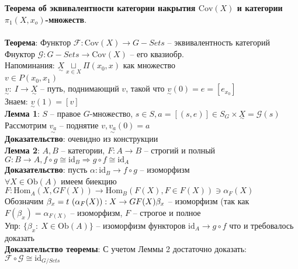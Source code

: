 \section{}
	\textbf{Теорема об эквивалентности категории накрытия $\text{Cov}(X)$ и категории ${\pi}_1 (X,x_o)$-множеств}.\\
	\\
	\textbf{Теорема}: Функтор $\mathcal{F}: \text{Cov}(X) \rightarrow G-Sets$ -- эквивалентность категорий\\
	Фнуктор $\mathscr{G}: G-Sets \rightarrow \text{Cov}(X)$ -- его квазиобр.\\
	Напоминания: $\underset{\sim}{X} \underset{x\in X}{\sqcup} \Pi (x_0,x)$ как множество\\
	$v\in P(x_0,x_1)$\\
	$\underset{\sim}{v}:\ I \rightarrow \underset{\sim}{X}$ -- путь, поднимающий $v$, такой что $\underset{\sim}{v} (0) = e = [e_{x_0}]$\\
	Знаем: $\underset{\sim}{v} (1) = [v]$\\
	\textbf{Лемма 1}: $S$ -- правое $G$-множество, $s\in S, a = [(s,e)] \in S_G \times \underset{\sim}{X} = \mathscr{G} (s)$\\
	Рассмотрим $\underset{\sim}{v_a}$ -- поднятие $v, \underset{\sim}{v_a} (0) = a$\\
	\textbf{Доказательство}: очевидно из конструкции\\
	\textbf{Лемма 2}: $A,B$ -- категории, $F: A\rightarrow B$ -- строгий и полный\\
	$G: B\rightarrow A, f \circ g \cong  \text{id}_B \Rightarrow g \circ f \cong  \text{id}_A$\\
	\textbf{Доказательство}: пусть $\alpha:  \text{id}_B \rightarrow f \circ g$ -- изоморфизм\\
	$\forall X \in \text{Ob}(A)$ имеем биекцию\\
	$F: \text{Hom}_A (X, GF(X)) \rightarrow \text{Hom}_B (F(X), F\in F(X)) \ni {\alpha}_F(X)$\\
	Обозначим ${\beta}_x = t\ ({\alpha}_F(X)): X\rightarrow GF(X)\\
	{\beta}_x$ -- изоморфизм (так как $F({\beta}_x) = {\alpha}_{F(X)}$ -- изоморфизм, $F$ -- строгое и полное\\
	Упр: $\{ {\beta}_x:\ X\in \text{Ob}(A)\}$ -- изоморфизм функторов $ \text{id}_A \rightarrow g \circ f$ что и требовалось доказать\\
	\textbf{Доказательство теоремы}: С учетом Леммы 2 достаточно доказать: $\mathcal{F} \circ \mathscr{G} \cong  \text{id}_{G\slash Sets}$\\
